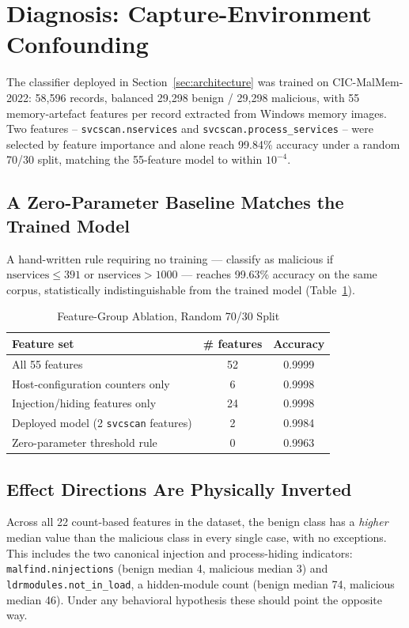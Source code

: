 \documentclass[conference]{IEEEtran}
\begin{document}

\section{Diagnosis: Capture-Environment Confounding}
\label{sec:diagnosis}

The classifier deployed in Section~\ref{sec:architecture} was trained on
CIC-MalMem-2022: 58{,}596 records, balanced 29{,}298 benign / 29{,}298
malicious, with 55 memory-artefact features per record extracted from
Windows memory images. Two features --
\texttt{svcscan.nservices} and \texttt{svcscan.process\_services} -- were
selected by feature importance and alone reach 99.84\% accuracy under a
random 70/30 split, matching the 55-feature model to within $10^{-4}$.

\subsection{A Zero-Parameter Baseline Matches the Trained Model}
A hand-written rule requiring no training --- classify as malicious if
$\text{nservices} \le 391$ or $\text{nservices} > 1000$ --- reaches 99.63\%
accuracy on the same corpus, statistically indistinguishable from the trained
model (Table~\ref{tab:ablation}).

\begin{table}[htbp]
\caption{Feature-Group Ablation, Random 70/30 Split}
\label{tab:ablation}
\centering
\begin{tabular}{lcc}
\toprule
Feature set & \# features & Accuracy \\
\midrule
All 55 features & 52 & 0.9999 \\
Host-configuration counters only & 6 & 0.9998 \\
Injection/hiding features only & 24 & 0.9998 \\
Deployed model (2 \texttt{svcscan} features) & 2 & 0.9984 \\
Zero-parameter threshold rule & 0 & 0.9963 \\
\bottomrule
\end{tabular}
\end{table}

\subsection{Effect Directions Are Physically Inverted}
Across all 22 count-based features in the dataset, the benign class has a
\emph{higher} median value than the malicious class in every single case, with
no exceptions. This includes the two canonical injection and process-hiding
indicators: \texttt{malfind.ninjections} (benign median 4, malicious median 3)
and \texttt{ldrmodules.not\_in\_load}, a hidden-module count (benign median 74,
malicious median 46). Under any behavioral hypothesis these should point the
opposite way.
\end{document}
